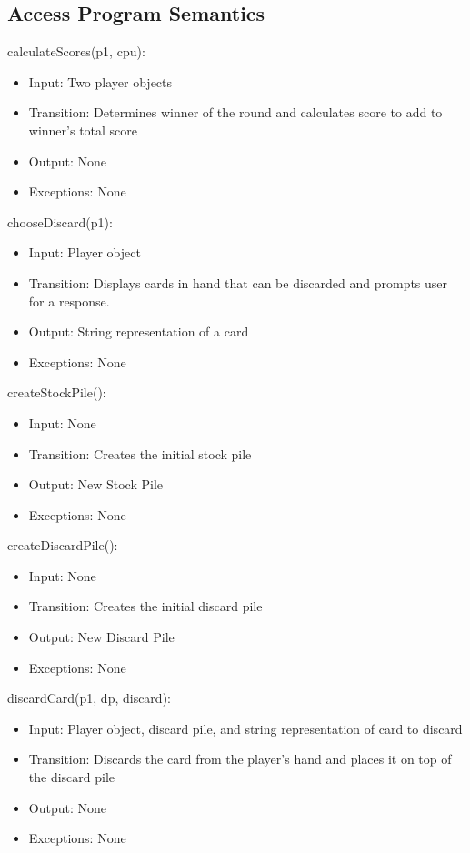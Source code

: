 \documentclass[12pt, titlepage]{article}
\begin{document}
\subsection{Access Program Semantics}
\noindent calculateScores(p1, cpu):
\begin{itemize}
    \item Input: Two player objects
    \item Transition: Determines winner of the round and calculates score to add to winner's total score
    \item Output: None
    \item Exceptions: None
\end{itemize}

\noindent chooseDiscard(p1):
\begin{itemize}
    \item Input: Player object
    \item Transition: Displays cards in hand that can be discarded and prompts user for a response.
    \item Output: String representation of a card
    \item Exceptions: None
\end{itemize}

\noindent createStockPile():
\begin{itemize}
    \item Input: None
    \item Transition: Creates the initial stock pile
    \item Output: New Stock Pile
    \item Exceptions: None
\end{itemize}

\noindent createDiscardPile():
\begin{itemize}
    \item Input: None
    \item Transition: Creates the initial discard pile
    \item Output: New Discard Pile
    \item Exceptions: None
\end{itemize}

\noindent discardCard(p1, dp, discard):
\begin{itemize}
    \item Input: Player object, discard pile, and string representation of card to discard
    \item Transition: Discards the card from the player's hand and places it on top of the discard pile
    \item Output: None
    \item Exceptions: None
\end{itemize}
\end{document}
